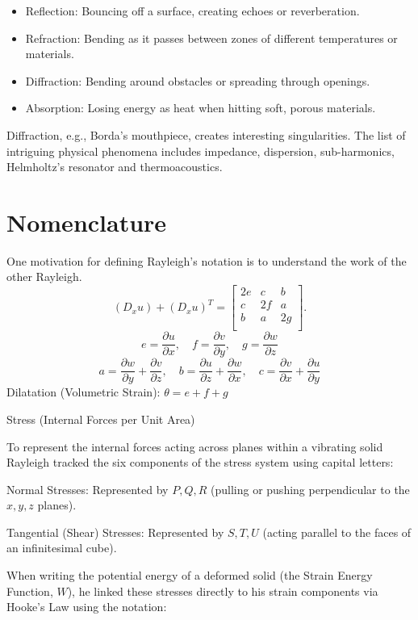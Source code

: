 \begin{itemize}
\item
  Reflection: Bouncing off a surface, creating echoes or reverberation.
\item
  Refraction: Bending as it passes between zones of different
  temperatures or materials.
\item
  Diffraction: Bending around obstacles or spreading through openings.
\item
  Absorption: Losing energy as heat when hitting soft, porous materials.
\end{itemize}

Diffraction, e.g., Borda's mouthpiece, creates interesting
singularities. The list of intriguing physical phenomena includes
impedance, dispersion, sub-harmonics, Helmholtz's resonator and
thermoacoustics.

\section{Nomenclature}\label{nomenclature}
One motivation for defining Rayleigh's notation is to understand the work of
the other Rayleigh.
\[(D_x u ) + {({D_x u})}^T =
\begin{bmatrix}
2e & c & b\\
c & 2f & a\\
b & a & 2g\\
\end{bmatrix}.\]
\[e=\frac{\partial u}{\partial x},\quad f=\frac{\partial v}{\partial y},\quad
g=\frac{\partial w}{\partial z}\]
\[a=\frac{\partial w}{\partial y}+\frac{\partial v}{\partial z},\quad
b=\frac{\partial u}{\partial z}+\frac{\partial w}{\partial x},\quad
c=\frac{\partial v}{\partial x}+\frac{\partial u}{\partial y}\]
Dilatation (Volumetric Strain): \(\theta =e+f+g\)

Stress (Internal Forces per Unit Area)

To represent the internal forces acting across planes within a vibrating
solid Rayleigh tracked the six components of the stress system using
capital letters:

Normal Stresses: Represented by \(P, Q, R\) (pulling or pushing
perpendicular to the \(x, y, z\) planes).

Tangential (Shear) Stresses: Represented by \(S, T, U\) (acting parallel
to the faces of an infinitesimal cube).

When writing the potential energy of a deformed solid (the Strain Energy
Function, \(W\)), he linked these stresses directly to his strain
components via Hooke's Law using the notation:


